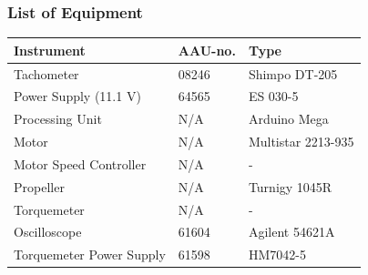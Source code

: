 \subsubsection{List of Equipment}
\begin{table}[H]
	\begin{tabular}{|l|l|p{4.3cm}|}
		\hline%
		\textbf{Instrument}                                  &  \textbf{AAU-no.}  &  \textbf{Type}                       \\
		\hline%
		Tachometer                                           &  08246           &  Shimpo DT-205		                   \\
		\hline%
	    Power Supply (11.1 V) &  64565                   &  ES 030-5                 \\
		\hline%
		Processing Unit                                   &  N/A               & Arduino Mega     \\
		\hline%
		Motor                                         &  N/A               & Multistar 2213-935     \\
		\hline%
		Motor Speed Controller                                   &  N/A               &  -      \\
		\hline%
		Propeller                                   &  N/A               & Turnigy 1045R     \\
		\hline%
		Torquemeter                                   &  N/A               & -     \\
		\hline%
		Oscilloscope                                   & 61604               & Agilent 54621A     \\
		\hline%
		Torquemeter Power Supply                   &  61598              & HM7042-5    \\
		\hline%
		
	\end{tabular}
\end{table}

